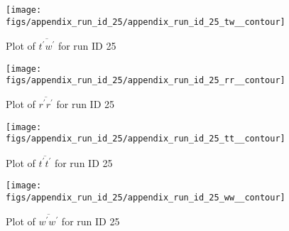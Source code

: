 \begin{figure}[H]
\centering
\texttt{[image: figs/appendix\_run\_id\_25/appendix\_run\_id\_25\_tw\_\_contour]}
\caption{Plot of $\overline{t^\prime w^\prime}$ for run ID 25}
\label{fig:appendix_run_id_25_tw__contour}
\end{figure}


\begin{figure}[H]
\centering
\texttt{[image: figs/appendix\_run\_id\_25/appendix\_run\_id\_25\_rr\_\_contour]}
\caption{Plot of $\overline{r^\prime r^\prime}$ for run ID 25}
\label{fig:appendix_run_id_25_rr__contour}
\end{figure}


\begin{figure}[H]
\centering
\texttt{[image: figs/appendix\_run\_id\_25/appendix\_run\_id\_25\_tt\_\_contour]}
\caption{Plot of $\overline{t^\prime t^\prime}$ for run ID 25}
\label{fig:appendix_run_id_25_tt__contour}
\end{figure}


\begin{figure}[H]
\centering
\texttt{[image: figs/appendix\_run\_id\_25/appendix\_run\_id\_25\_ww\_\_contour]}
\caption{Plot of $\overline{w^\prime w^\prime}$ for run ID 25}
\label{fig:appendix_run_id_25_ww__contour}
\end{figure}


